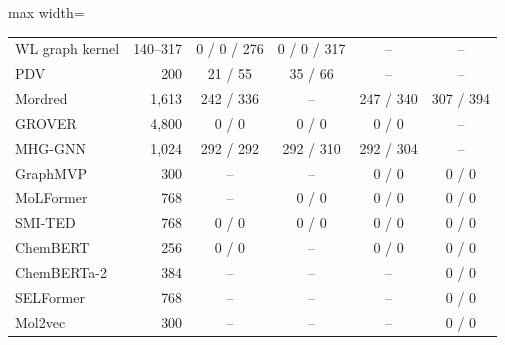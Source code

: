 \begin{table}[htbp]
\begin{adjustbox}{max width=\textwidth}
\begin{tabular}{lrcccc}
WL graph kernel & 140--317 & 0 / 0 / 276 & 0 / 0 / 317 & -- & -- \\
PDV & 200 & 21 / 55 & 35 / 66 & -- & -- \\
Mordred & 1,613 & 242 / 336 & -- & 247 / 340 & 307 / 394 \\
GROVER & 4,800 & 0 / 0 & 0 / 0 & 0 / 0 & -- \\
MHG-GNN & 1,024 & 292 / 292 & 292 / 310 & 292 / 304 & -- \\
GraphMVP & 300 & -- & -- & 0 / 0 & 0 / 0 \\
MoLFormer & 768 & -- & 0 / 0 & 0 / 0 & 0 / 0 \\
SMI-TED & 768 & 0 / 0 & 0 / 0 & 0 / 0 & 0 / 0 \\
ChemBERT & 256 & 0 / 0 & -- & 0 / 0 & 0 / 0 \\
ChemBERTa-2 & 384 & -- & -- & -- & 0 / 0 \\
SELFormer & 768 & -- & -- & -- & 0 / 0 \\
Mol2vec & 300 & -- & -- & -- & 0 / 0 \\
\bottomrule
\end{tabular}
\end{adjustbox}
\end{table}

